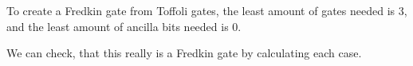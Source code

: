 \documentclass[a4paper,12pt]{article}
\begin{document}
    To create a Fredkin gate from Toffoli gates, the least amount of gates needed is 3, and the least amount of ancilla bits needed is 0.
    \begin{center}
    \end{center}
    We can check, that this really is a Fredkin gate by calculating each case.

    \newpage

    
    
\end{document}
